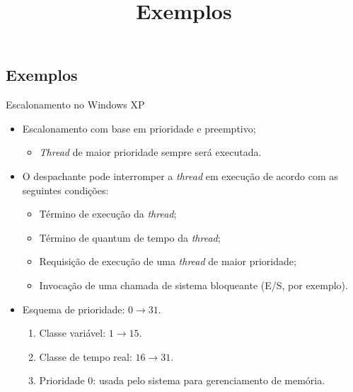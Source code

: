 \def\thetitle{Exemplos}
\title{\thetitle}
\frame{\date{}\author{}\titlepage}

\subsection{\thetitle}

\begin{frame}{Escalonamento no Windows XP}

  \begin{itemize}
  \item Escalonamento com base em \alert{prioridade} e
    \alert{preemptivo};
    \begin{itemize}
    \item \alert{\em Thread} de maior prioridade sempre será executada.
    \end{itemize}
    \pause
  \item O \alert{despachante} pode interromper a {\em thread} em
    execução de acordo com as seguintes condições:
    \begin{itemize}
    \item Término de execução da {\em thread};
    \item Término de quantum de tempo da {\em thread};
    \item Requisição de execução de uma {\em thread} de maior prioridade;
    \item Invocação de uma chamada de sistema bloqueante (E/S, por exemplo).
    \end{itemize}
    \pause
  \item Esquema de prioridade: $0 \rightarrow 31$.
    \begin{enumerate}
    \item Classe variável: $1 \rightarrow 15$.
    \item Classe de tempo real: $16 \rightarrow 31$.
    \item Prioridade $0$: usada pelo sistema para gerenciamento de memória.
    \end{enumerate}
  \end{itemize}
  
\end{frame}



